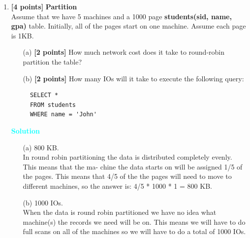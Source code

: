 \documentclass[10pt]{article}
\newenvironment{solution}
    { \begin{mdframed}[backgroundcolor=gray!10] \textcolor{cyan}{\textbf{Solution}} \\}
    {  \end{mdframed}}
\begin{document}
\begin{enumerate}

	\item \textbf{[4 points]} \textbf{Partition} \\
	      Assume that we have 5 machines and a 1000 page \textbf{students(sid, name, gpa)} table. Initially,
	      all of the pages start on one machine. Assume each page is 1KB.
	      \begin{itemize}
		      \item[(a)] \textbf{[2 points]} How much network cost does it take to round-robin partition the table?
		      \item[(b)] \textbf{[2 points]} How many IOs will it take to execute the following query:
		            \begin{lstlisting} 
  SELECT *
  FROM students
  WHERE name = 'John'
\end{lstlisting}
	      \end{itemize}
	      \begin{solution}
		      \begin{itemize}
			      \item[(a)] 800 KB. \\
			            In round robin partitioning the data is distributed completely evenly. This means that the ma-
			            chine the data starts on will be assigned 1/5 of the pages. This means that 4/5 of the the pages
			            will need to move to different machines, so the answer is: 4/5 * 1000 * 1 = 800 KB.
			      \item[(b)] 1000 IOs. \\
			            When the data is round robin partitioned we have no idea what machine(s) the records we
			            need will be on. This means we will have to do full scans on all of the machines so we will have to
			            do a total of 1000 IOs.
		      \end{itemize}
	      \end{solution}


\end{enumerate}
\end{document}
